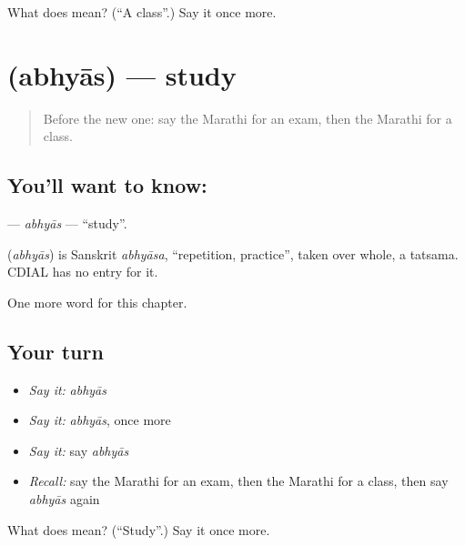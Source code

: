 \begin{tcolorbox}[breakable,colback=teal!4,colframe=teal!35!black,title={Before you move on}]
What does  mean? (\textquotedblleft{}A class\textquotedblright{}.) Say it once more.
\end{tcolorbox}
\section[\texorpdfstring{\mr{अभ्यास} (abhyās)}{अभ्यास (abhyās)}]{ (abhyās) — study}

\label{lesson:MR-C135-abhyas}



\begin{quote}
Before the new one: say the Marathi for an exam, then the Marathi for a class.
\end{quote}

\subsection*{You'll want to know: }
\textbf{} — \emph{abhyās} — \textquotedblleft{}study\textquotedblright{}.

\begin{cousinweb}
\textbf{} (\emph{abhyās}) is Sanskrit \emph{abhyāsa}, \textquotedblleft{}repetition, practice\textquotedblright{}, taken over whole, a tatsama. CDIAL has no entry for it.
\end{cousinweb}

\begin{grammarlens}[title={What you've built}]
One more word for this chapter.
\end{grammarlens}

\subsection*{Your turn}
\begin{itemize}
\raggedright
  \item \emph{Say it:} \emph{abhyās}
  \item \emph{Say it:} \emph{abhyās}, once more
  \item \emph{Say it:} say \emph{abhyās}
  \item \emph{Recall:} say the Marathi for an exam, then the Marathi for a class, then say \emph{abhyās} again
\end{itemize}

\begin{tcolorbox}[breakable,colback=teal!4,colframe=teal!35!black,title={Before you move on}]
What does  mean? (\textquotedblleft{}Study\textquotedblright{}.) Say it once more.
\end{tcolorbox}
